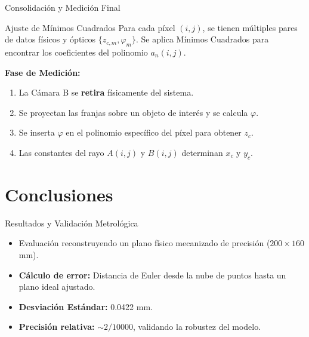 \documentclass[aspectratio=169]{beamer}
\begin{document}
	\begin{frame}{Consolidación y Medición Final}
		\begin{block}{Ajuste de Mínimos Cuadrados}
			Para cada píxel $(i,j)$, se tienen múltiples pares de datos físicos y ópticos $\{z_{c,m}, \varphi_m\}$. Se aplica Mínimos Cuadrados para encontrar los coeficientes del polinomio $a_n(i,j)$.
		\end{block}
		
		\vspace{0.2cm}
		\textbf{Fase de Medición:}
		\begin{enumerate}
			\item La Cámara B se \textbf{retira} físicamente del sistema.
			\item Se proyectan las franjas sobre un objeto de interés y se calcula $\varphi$.
			\item Se inserta $\varphi$ en el polinomio específico del píxel para obtener $z_c$.
			\item Las constantes del rayo $A(i,j)$ y $B(i,j)$ determinan $x_c$ y $y_c$.
		\end{enumerate}
	\end{frame}
	
	\section{Conclusiones}
	
	\begin{frame}{Resultados y Validación Metrológica}
		
				\begin{itemize}
					\item Evaluación reconstruyendo un plano físico mecanizado de precisión ($200\times160$ mm).
					\item \textbf{Cálculo de error:} Distancia de Euler desde la nube de puntos hasta un plano ideal ajustado.
					\item \textbf{Desviación Estándar:} 0.0422 mm.
					\item \textbf{Precisión relativa:} $\sim 2/10000$, validando la robustez del modelo.
				\end{itemize}
			
	\end{frame}
	
\end{document}
